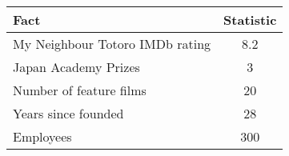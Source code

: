 \begin{tabular}{lc}
\hline
\textbf{Fact} & \textbf{Statistic} \\
\hline
My Neighbour Totoro IMDb rating & 8.2 \\
Japan Academy Prizes & 3 \\
Number of feature films & 20 \\
Years since founded & 28 \\
Employees & 300 \\
\hline
\end{tabular}